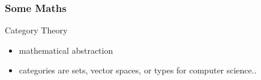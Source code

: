 \documentclass[12pt, xcolor=table]{beamer}
\begin{document}
%
%
%

\begin{frame}
    \frametitle{Some Maths}
        \begin{block}{Category Theory}
        \begin{itemize}
            \item mathematical abstraction
            \item categories are sets, vector spaces, or types for computer science..
        \end{itemize}
        \end{block}
\end{frame}
\end{document}
